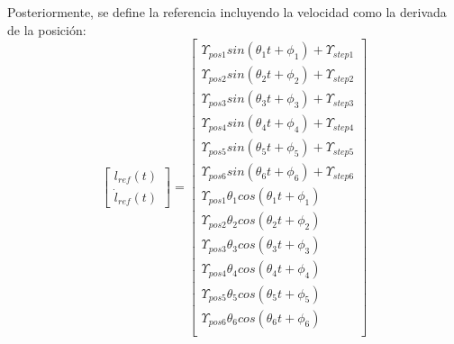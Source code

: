 Posteriormente, se define la referencia incluyendo la velocidad como la derivada de la posición:
\begin{equation}
    \begin{bmatrix}
        l_{ref}(t) \\ \dot{l}_{ref}(t)
    \end{bmatrix} = \begin{bmatrix}
        \Upsilon_{pos1} sin(\theta_1 t + \phi_1) + \Upsilon_{step1}\\
        \Upsilon_{pos2} sin(\theta_2 t + \phi_2) + \Upsilon_{step2}\\
        \Upsilon_{pos3} sin(\theta_3 t + \phi_3) + \Upsilon_{step3}\\
        \Upsilon_{pos4} sin(\theta_4 t + \phi_4) + \Upsilon_{step4}\\
        \Upsilon_{pos5} sin(\theta_5 t + \phi_5) + \Upsilon_{step5}\\
        \Upsilon_{pos6} sin(\theta_6 t + \phi_6) + \Upsilon_{step6}\\
        \Upsilon_{pos1} \theta_1 cos(\theta_1 t + \phi_1)\\
        \Upsilon_{pos2} \theta_2 cos(\theta_2 t + \phi_2)\\
        \Upsilon_{pos3} \theta_3 cos(\theta_3 t + \phi_3)\\
        \Upsilon_{pos4} \theta_4 cos(\theta_4 t + \phi_4)\\
        \Upsilon_{pos5} \theta_5 cos(\theta_5 t + \phi_5)\\
        \Upsilon_{pos6} \theta_6 cos(\theta_6 t + \phi_6)\\
    \end{bmatrix}
\end{equation}

